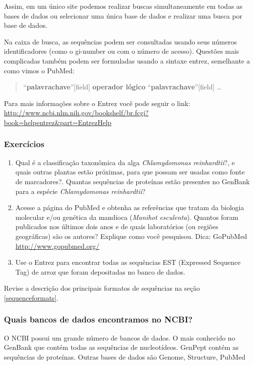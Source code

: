 \documentclass[letter,11pt]{book}
\begin{document}
Assim, em um único site podemos realizar buscas simultaneamente em todas as bases de dados ou selecionar uma única base de dados e realizar uma busca por base de dados. 

Na caixa de busca, as sequências podem ser consultadas usando seus números identificadores (como o gi-number ou com o número de acesso). Questões mais complicadas também podem ser formuladas usando a sintaxe entrez, semelhante a como vimos o PubMed: 

\begin{quote}
``\textbf{palavrachave}''[field] \textbf{operador lógico} ``\textbf{palavrachave}''[field] \ldots
\end{quote}

Para mais informações sobre o Entrez você pode seguir o link:
\url{http://www.ncbi.nlm.nih.gov/bookshelf/br.fcgi?book=helpentrez&part=EntrezHelp}

{\color{red}
\subsubsection{Exercícios}

\begin{enumerate}
\item Qual é a classificação taxonômica da alga \textit{Chlamydomonas reinhardtii}?, e quais outras plantas estão próximas, para que possam ser usadas como fonte de marcadores?. Quantas sequências de proteínas estão presentes no GenBank para a espécie \textit{Chlamydomonas reinhardtii}? 
\item Acesse a página do PubMed e obtenha as referências que tratam da biologia molecular e/ou genética da mandioca (\textit{Manihot esculenta}). Quantos foram publicados nos últimos dois anos e de quais laboratórios (ou regiões geográficas) são os autores? Explique como você pesquisou. Dica: GoPubMed \url{http://www.gopubmed.org/}
\item Use o Entrez para encontrar todas as sequências EST (Expressed Sequence Tag) de arroz que foram depositadas no banco de dados.
\end{enumerate}
}

Revise a descrição dos principais formatos de sequências na seção
\ref{sequenceformats}.

\subsubsection{Quais bancos de dados encontramos no NCBI?}

O NCBI possui um grande número de bancos de dados. O mais conhecido no GenBank que contém todas as sequências de nucleotídeos. GenPept contém as sequências de proteínas. Outras bases de dados são Genome, Structure, PubMed
\end{document}
